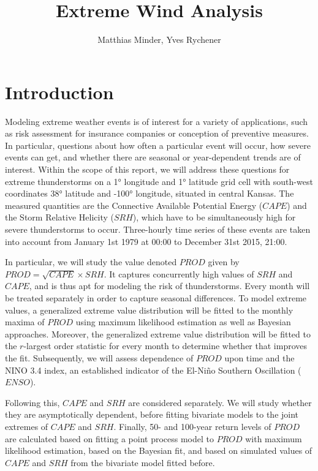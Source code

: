 \documentclass[10pt,conference,compsocconf]{IEEEtran}
\begin{document}
\title{Extreme Wind Analysis}

\author{
	Matthias Minder, Yves Rychener
}

\maketitle


\begin{abstract}

\end{abstract}

\section*{Introduction} 
Modeling extreme weather events is of interest for a variety of applications, such as risk assessment for insurance companies or conception of preventive measures. In particular, questions about how often a particular event will occur, how severe events can get, and whether there are seasonal or year-dependent trends are of interest. Within the scope of this report, we will address these questions for extreme thunderstorms on a 1° longitude and 1° latitude grid cell with south-west coordinates 38° latitude and -100° longitude, situated in central Kansas. The measured quantities are the Connective Available Potential Energy ($CAPE$) and the Storm Relative Helicity ($SRH$), which have to be simultaneously high for severe thunderstorms to occur. Three-hourly time series of these events are taken into account from January 1st 1979 at 00:00 to December 31st 2015, 21:00. 
\par
In particular, we will study the value denoted $PROD$ given by $PROD = \sqrt{CAPE} \times SRH$. It captures concurrently high values of $SRH$ and $CAPE$, and is thus apt for modeling the risk of thunderstorms. Every month will be treated separately in order to capture seasonal differences. To model extreme values, a generalized extreme value distribution will be fitted to the monthly maxima of $PROD$ using maximum likelihood estimation as well as Bayesian approaches. Moreover, the generalized extreme value distribution will be fitted to the $r$-largest order statistic for every month to determine whether that improves the fit. Subsequently, we will assess dependence of $PROD$ upon time and the NINO 3.4 index, an established indicator of the El-Niño Southern Oscillation ($ENSO$). 
\par
Following this, $CAPE$ and $SRH$ are considered separately. We will study whether they are asymptotically dependent, before fitting bivariate models to the joint extremes of $CAPE$ and $SRH$. 
Finally, 50- and 100-year return levels of $PROD$ are calculated based on fitting a point process model to $PROD$ with maximum likelihood estimation, based on the Bayesian fit, and based on simulated values of $CAPE$ and $SRH$ from the bivariate model fitted before. 
\end{document}
